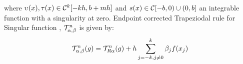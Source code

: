 \documentclass[../document.tex]{subfiles}
\begin{document}
	where $\upsilon(x) , \tau(x) \in \mathcal{C}^k[-kh,b+mh]$  and 
	$s(x) \in \mathcal{C}[-b,0)\cup(0, b] $ an integrable function with a singularity at zero. Endpoint corrected Trapeziodal rule for Singular function , $\mathcal{T}_{\alpha,\beta}^{n}$ is given by:
	\begin{equation} 
		\begin{split}
			\mathcal{T}_{\alpha,\beta}^{n} (g)= \mathcal{T}_{R\alpha}^{n} (g) + 
			h\sum_{j=-k,j \neq 0}^{k} \beta_j f(x_j)
		\end{split}
	\end{equation}
	
	
	
	\begin{center}
		\resizebox{\textwidth}{!}{
			
}
\end{center}
\end{document}
